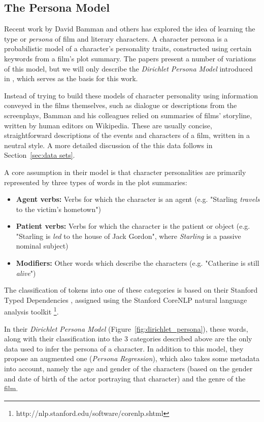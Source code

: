 \documentclass[bsc,frontabs,singlespacing,parskip, twoside]{infthesis}
\begin{document}
\subsection{The Persona Model}
\label{sec:bg_persona}
Recent work by David Bamman and others has explored the idea of learning the type or \textit{persona} of film \cite{Bamman2013} and literary \cite{Bamman2014} characters. A character persona is a probabilistic model of a character's personality traits, constructed using certain keywords from a film's plot summary. The papers present a number of variations of this model, but we will only describe the \textit{Dirichlet Persona Model} introduced in \cite{Bamman2013}, which serves as the basis for this work.

Instead of trying to build these models of character personality using information conveyed in the films themselves, such as dialogue or descriptions from the screenplays, Bamman and his colleagues relied on summaries of films' storyline, written by human editors on Wikipedia. These are usually concise, straightforward descriptions of the events and characters of a film, written in a neutral style. A more detailed discussion of the this data follows in Section~\ref{sec:data sets}. 

A core assumption in their model is that character personalities are primarily represented by three types of words in the plot summaries:
\begin{itemize}
	\item \textbf{Agent verbs:} Verbs for which the character is an agent (e.g. "Starling \textit{travels} to the victim's hometown")
	\item \textbf{Patient verbs:} Verbs for which the character is the patient or object (e.g. "Starling is \textit{led} to the house of Jack Gordon", where \textit{Starling} is a passive nominal subject)
	\item \textbf{Modifiers:} Other words which describe the characters (e.g. "Catherine is still \textit{alive}")
\end{itemize}
The classification of tokens into one of these categories is based on their Stanford Typed Dependencies \cite{de2008stanford}, assigned using the Stanford CoreNLP natural language analysis toolkit \footnote{http://nlp.stanford.edu/software/corenlp.shtml}.

In their \textit{Dirichlet Persona Model} (Figure~\ref{fig:dirichlet_persona}), these words, along with their classification into the 3 categories described above are the only data used to infer the persona of a character. In addition to this model, they propose an augmented one (\textit{Persona Regression}), which also takes some metadata into account, namely the age and gender of the characters (based on the gender and date of birth of the actor portraying that character) and the genre of the film.
\end{document}
